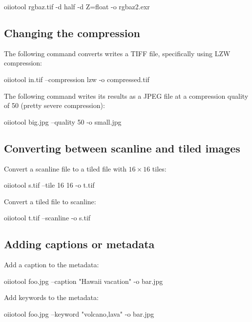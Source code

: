 \begin{code}
    oiiotool rgbaz.tif -d half -d Z=float -o rgbaz2.exr
\end{code}


\subsection*{Changing the compression}

The following command converts writes a TIFF file, specifically using
LZW compression:

\begin{code}
    oiiotool in.tif --compression lzw -o compressed.tif
\end{code}

The following command writes its results as a JPEG file at a 
compression quality of 50 (pretty severe compression):

\begin{code}
    oiiotool big.jpg --quality 50 -o small.jpg
\end{code}



\subsection*{Converting between scanline and tiled images}

Convert a scanline file to a tiled file with $16 \times 16$ tiles:

\begin{code}
    oiiotool s.tif --tile 16 16 -o t.tif
\end{code}

\noindent Convert a tiled file to scanline:

\begin{code}
    oiiotool t.tif --scanline -o s.tif
\end{code}



\subsection*{Adding captions or metadata}

\noindent Add a caption to the metadata:
\begin{code}
    oiiotool foo.jpg --caption "Hawaii vacation" -o bar.jpg
\end{code}

\noindent Add keywords to the metadata:
\begin{code}
    oiiotool foo.jpg --keyword "volcano,lava" -o bar.jpg
\end{code}

